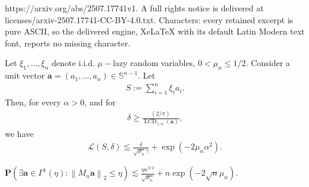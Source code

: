 \documentclass[10pt,a4paper]{amsart}
\begin{document}
https://arxiv.org/abs/2507.17741v1. A full rights notice is delivered at licenses/arxiv-2507.17741-CC-BY-4.0.txt. Characters: every retained excerpt is pure ASCII, so the delivered engine, XeLaTeX with its default Latin Modern text font, reports no missing character.
\begin{lemma}\label{lcd}
Let $\xi_1, \ldots, \xi_n$ denote i.i.d. $\mu-$lazy random variables, $0<\mu_{n}\leq1/2$. Consider a unit vector $\boldsymbol{a}=\left(a_1, \ldots, a_n\right) \in \mathbb{S}^{n-1}$. Let
\begin{align*}
S:=\sum_{i=1}^n \xi_i a_i.
\end{align*}
Then, for every $\alpha>0$, and for
\begin{align*}
\delta \geq \frac{(2 / \pi)}{\operatorname{LCD}_{\gamma, \alpha}(\boldsymbol{a})},
\end{align*}
we have
\begin{align*}
\mathcal{L}(S, \delta) \lesssim \frac{\delta}{\sqrt{\mu_{n}}\gamma}+\exp \left(-2\mu_{n}\alpha^2\right).
\end{align*}
\end{lemma}

\begin{proposition}\label{pro1}
$\textbf{P}\left(\exists \boldsymbol{a} \in \Gamma^1(\eta):\left\|M_n \boldsymbol{a}\right\|_2 \leq \eta\right) \lesssim \frac{\eta n^{3 / 2}}{\sqrt{\mu_{n}}}+n \exp (-2\sqrt{n}\mu_{n})$.
\end{proposition}
\end{document}
